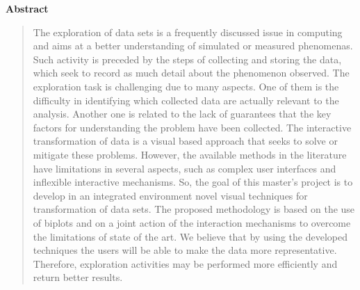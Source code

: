 \begin{center}
  \textbf{Abstract}
\end{center}

\begin{quotation}
\noindent
%
The exploration of data sets is a frequently discussed issue
in computing and aims at a better understanding of simulated
or measured phenomenas.
%
Such activity is preceded by the steps of collecting and
storing the data, which seek to record as much detail about
the phenomenon observed.
%
The exploration task is challenging due to many aspects.
%
One of them is the difficulty in identifying which collected
data are actually relevant to the analysis. 
%
Another one is related to the lack of guarantees that the
key factors for understanding the problem have been
collected.
%
The interactive transformation of data is a visual based
approach that seeks to solve or mitigate these problems.
%
However, the available methods in the literature have
limitations in several aspects, such as complex user
interfaces and inflexible interactive mechanisms.
%
So, the goal of this master's project is to develop in an 
integrated environment novel visual techniques for
transformation of data sets.
%
The proposed methodology is based on the use of biplots and
on a joint action of the interaction mechanisms to overcome the
limitations of state of the art.
%
We believe that by using the developed techniques the users
will be able to make the data more representative.
%
Therefore, exploration activities may be performed more
efficiently and return better results.


\end{quotation}
